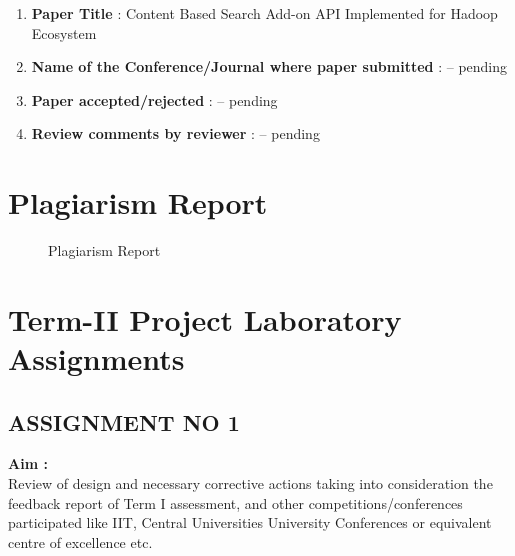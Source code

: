 \documentclass[oneside,a4paper,12pt]{report}
\begin{document}
{\begin{appendices}
\begin{enumerate}
\item \textbf{Paper Title } : Content Based Search Add-on API Implemented for Hadoop Ecosystem
\item \textbf{Name of the Conference/Journal where paper submitted } : -- pending
\item \textbf{Paper accepted/rejected } : -- pending
\item \textbf{Review comments by reviewer} : -- pending
	
\end{enumerate}


\chapter{Plagiarism Report}
\begin{center}
	\begin{figure}[!htbp]
		\centering
	  \caption{Plagiarism Report}
	  \label{fig:usecase}
	\end{figure}
\end{center}  


\chapter{ Term-II Project Laboratory Assignments}

\section{ASSIGNMENT NO 1}

\textbf{Aim :} \\

Review of design and necessary corrective actions taking into consideration the feedback report of Term I assessment, and other competitions/conferences participated like IIT, Central Universities University Conferences or equivalent centre of excellence etc.
\\


\end{appendices}}
\end{document}
